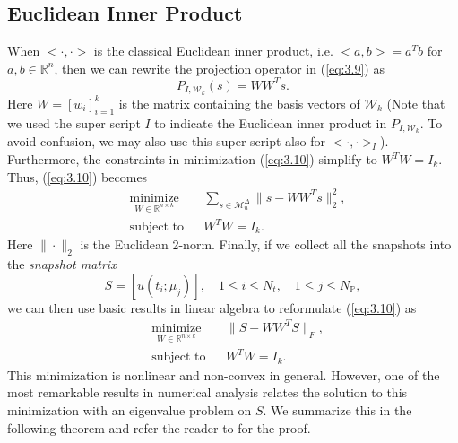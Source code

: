 \subsection{Euclidean Inner Product} \label{sec:3.2.1}
When $<\cdot,\cdot>$ is the classical Euclidean inner product, i.e. $<a,b> = a^Tb$ for $a,b\in \mathbb R^{n}$, then we can rewrite the projection operator in (\ref{eq:3.9}) as
\begin{equation}
	P_{I,\mathcal W_k} (s) = WW^T s.
\end{equation}
Here $W = [w_i]_{i=1}^k$ is the matrix containing the basis vectors of $\mathcal W_k$ (Note that we used the super script $I$ to indicate the Euclidean inner product in $P_{I,\mathcal W_k}$. To avoid confusion, we may also use this super script also for $<\cdot,\cdot>_I$). Furthermore, the constraints in minimization (\ref{eq:3.10}) simplify to $W^TW = I_k$. Thus, (\ref{eq:3.10}) becomes
\begin{equation} \label{eq:3.11}
\begin{aligned}
&  \underset{W\in\mathbb R^{n\times k}}{\text{minimize}}
& & \sum_{s\in \mathcal M_u^{\Delta}} \| s - WW^Ts\|^2_2, \\
& \text{subject to}
& & W^TW=I_k.
\end{aligned}
\end{equation}
Here $\|\cdot \|_2$ is the Euclidean 2-norm. Finally, if we collect all the snapshots into the \emph{snapshot matrix}
\begin{equation} \label{eq:3.12}
	S = [u(t_i;\mu_j)],\quad 1\leq i \leq N_t,\quad 1 \leq j \leq N_{\mathbb P},
\end{equation}
we can then use basic results in linear algebra \cite{trefethen97} to reformulate (\ref{eq:3.10}) as
\begin{equation} \label{eq:3.13}
\begin{aligned}
&  \underset{W\in\mathbb R^{n\times k}}{\text{minimize}}
& & \| S - WW^TS \|_F, \\
& \text{subject to}
& & W^TW=I_k.
\end{aligned}
\end{equation}
This minimization is nonlinear and non-convex in general. However, one of the most remarkable results in numerical analysis relates the solution to this minimization with an eigenvalue problem on $S$. We summarize this in the following theorem and refer the reader to \cite{Markovsky:2011:LRA:2103589} for the proof.
